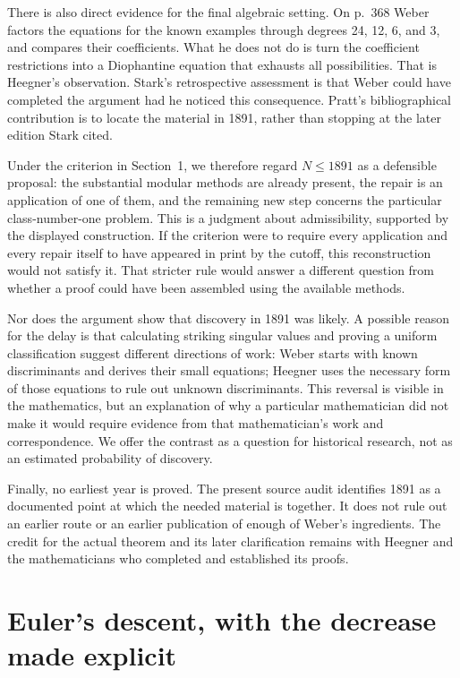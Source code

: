 \documentclass[11pt]{article}
\begin{document}
There is also direct evidence for the final algebraic setting.
On p.~368 Weber factors the equations for the known examples through
degrees 24, 12, 6, and 3, and compares their coefficients. What he does
not do is turn the coefficient restrictions into a Diophantine equation
that exhausts all possibilities. That is Heegner's observation. Stark's
retrospective assessment \cite[\S5]{stark} is that Weber could have
completed the argument had he noticed this consequence. Pratt's
bibliographical contribution \cite{pratt} is to locate the material
in 1891, rather than stopping at the later edition Stark cited.

Under the criterion in Section~1, we therefore regard
\(N\le1891\) as a defensible proposal: the substantial modular
methods are already present, the repair is an application of one of
them, and the remaining new step concerns the particular
class-number-one problem. This is a judgment about admissibility,
supported by the displayed construction. If the criterion were to
require every application and every repair itself to have appeared in
print by the cutoff, this reconstruction would not satisfy it. That
stricter rule would answer a different question from whether a proof
could have been assembled using the available methods.

Nor does the argument show that discovery in 1891 was likely. A possible
reason for the delay is that calculating striking singular values and
proving a uniform classification suggest different directions of work:
Weber starts with known discriminants and derives their small equations;
Heegner uses the necessary form of those equations to rule out unknown
discriminants. This reversal is visible in the mathematics, but an
explanation of why a particular mathematician did not make it would
require evidence from that mathematician's work and correspondence.
We offer the contrast as a question for historical research, not as an
estimated probability of discovery.

Finally, no earliest year is proved. The present source audit identifies
1891 as a documented point at which the needed material is together.
It does not rule out an earlier route or an earlier publication of
enough of Weber's ingredients. The credit for the actual theorem and
its later clarification remains with Heegner and the mathematicians
who completed and established its proofs.

\appendix
\section{Euler's descent, with the decrease made explicit}\label{descent}
\end{document}

